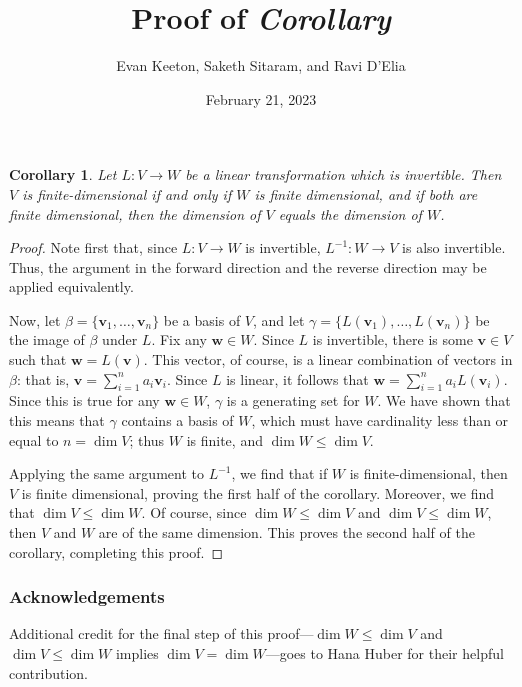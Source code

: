 \documentclass{article}
\title{Proof of \emph{Corollary}}
\author{Evan Keeton, Saketh Sitaram, and Ravi D'Elia}
\date{February 21, 2023}
\renewcommand{\vec}[1]{\mathbf{#1}}
\begin{document}
  \maketitle

  \newtheorem*{crll}{Corollary}

  \begin{crll}
    Let $L: V \to W$ be a linear transformation which is invertible. Then $V$ is finite-dimensional if and only if $W$ is finite dimensional, and if both are finite dimensional, then the dimension of $V$ equals the dimension of $W$.
  \end{crll}

  \begin{proof}
    Note first that, since $L: V \to W$ is invertible, $L^{-1}: W \to V$ is also invertible. Thus, the argument in the forward direction and the reverse direction may be applied equivalently.

    Now, let $\beta = \{\vec{v}_{1},\ldots,\vec{v}_{n}\}$ be a basis of $V$, and let $\gamma = \{L(\vec{v}_{1}),\ldots,L(\vec{v}_{n})\}$ be the image of $\beta$ under $L$. Fix any $\vec{w}\in W$. Since $L$ is invertible, there is some $\vec{v}\in V$ such that $\vec{w} = L(\vec{v})$. This vector, of course, is a linear combination of vectors in $\beta$: that is, $\vec{v} = \sum_{i = 1}^{n} a_{i}\vec{v}_{i}$. Since $L$ is linear, it follows that $\vec{w} = \sum_{i = 1}^{n} a_{i}L(\vec{v}_{i})$. Since this is true for any $\vec{w} \in W$, $\gamma$ is a generating set for $W$. We have shown that this means that $\gamma$ contains a basis of $W$, which must have cardinality less than or equal to $n = \dim V$; thus $W$ is finite, and $\dim W \leq \dim V$.

    Applying the same argument to $L^{-1}$, we find that if $W$ is finite-dimensional, then $V$ is finite dimensional, proving the first half of the corollary. Moreover, we find that $\dim V \leq \dim W$. Of course, since $\dim W \leq \dim V$ and $\dim V \leq \dim W$, then $V$ and $W$ are of the same dimension. This proves the second half of the corollary, completing this proof.
  \end{proof}

  \subsubsection*{Acknowledgements}
    Additional credit for the final step of this proof---$\dim W \leq \dim V$ and $\dim V \leq \dim W$ implies $\dim V = \dim W$---goes to Hana Huber for their helpful contribution.

\end{document}
